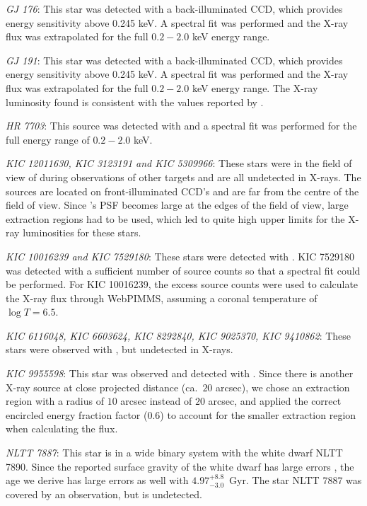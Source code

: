 \textit{GJ 176}: This star was detected with a back-illuminated \Chandra CCD, which provides energy sensitivity above 0.245 keV. A spectral fit was performed and the X-ray flux was extrapolated for the full $0.2 - 2.0$ keV energy range.

\textit{GJ 191}: This star was detected with a back-illuminated \Chandra CCD, which provides energy sensitivity above 0.245 keV. A spectral fit was performed and the X-ray flux was extrapolated for the full $0.2 - 2.0$ keV energy range. The X-ray luminosity found is consistent with the values reported by \citet{Guinan_etal_2016}.

\textit{HR 7703}: This source was detected with \XMM and a spectral fit was performed for the full energy range of $0.2 - 2.0$ keV.

\textit{KIC 12011630, KIC 3123191 and KIC 5309966}: These stars were in the field of view of \Chandra during observations of other targets and are all undetected in X-rays. The sources are located on front-illuminated CCD's and are far from the centre of the field of view. Since \Chandra's PSF becomes large at the edges of the field of view, large extraction regions had to be used, which led to quite high upper limits for the X-ray luminosities for these stars.

\textit{KIC 10016239 and KIC 7529180}: These stars were detected with \XMM. KIC 7529180 was detected with a sufficient number of source counts so that a spectral fit could be performed. For KIC 10016239, the excess source counts were used to calculate the X-ray flux through WebPIMMS, assuming a coronal temperature of $\log T = 6.5$.

\textit{KIC 6116048, KIC 6603624, KIC 8292840, KIC 9025370, KIC 9410862}: These stars were observed with \XMM, but undetected in X-rays.

\textit{KIC 9955598}: This star was observed and detected with \XMM. Since there is another X-ray source at close projected distance (ca.\ $20$ arcsec), we chose an extraction region with a radius of $10$ arcsec instead of $20$ arcsec, and applied the correct encircled energy fraction factor (0.6) to account for the smaller extraction region when calculating the flux.

\textit{NLTT 7887}: This star is in a wide binary system with the white dwarf NLTT 7890. Since the reported surface gravity of the white dwarf has large errors \citep{Garces_etal_2011}, the age we derive has large errors as well with $4.97^{+8.8}_{-3.0}$~Gyr. The star NLTT 7887 was covered by an \XMM observation, but is undetected.

